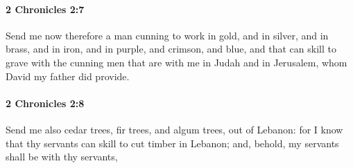 		\paragraph{2 Chronicles 2:7} %
			\label{2CHRONICLES-2-7}

			Send me now therefore a man cunning to work in gold, and in silver, and in brass, and in iron, and in purple, and crimson, and blue, and that can skill to grave with the cunning men that are with me in Judah and in Jerusalem, whom David my father did provide.


		\paragraph{2 Chronicles 2:8} %
			\label{2CHRONICLES-2-8}

			Send me also cedar trees, fir trees, and algum trees, out of Lebanon: for I know that thy servants can skill to cut timber in Lebanon; and, behold, my servants shall be with thy servants,


